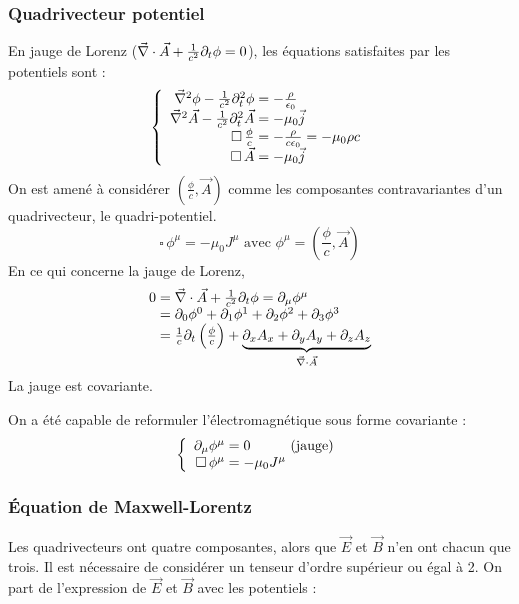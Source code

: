 \subsubsection{Quadrivecteur potentiel}
En jauge de Lorenz ($\vec{\nabla}\cdot\vec{A}+\frac{1}{c^2}\partial_t\phi=0$), les équations satisfaites par les potentiels sont :
$$
	\left\{ \begin{array}{r@{\;}l}
		\nab^2\phi - \frac{1}{c^2}\partial_t^2\phi&=-\frac{\rho}{\epsilon_0}\\
		\nab^2\vec{A}-\frac{1}{c^2}\partial_t^2\vec{A}&=-\mu_0\vec{j}\\
		\square\,\frac{\phi}{c}&=-\frac{\rho}{c\epsilon_0}=-\mu_0\rho c\\
		\square\,\vec{A}&=-\mu_0\vec{j}
	\end{array} \right.
$$
{\txt On est amené à considérer $(\frac{\phi}{c},\vec{A})$ comme les composantes contravariantes d'un quadrivecteur, le quadri-potentiel.}
$$
	\square\,\phi^\mu=-\mu_0J^\mu
	\text{ avec } \phi^\mu=(\frac{\phi}{c},\vec{A})
$$
En ce qui concerne la jauge de Lorenz,
$$
	\begin{array}{r@{\;}l}
		0&=\nab\cdot\vec{A}+\frac{1}{c^2}\partial_t\phi=\partial_\mu\phi^\mu\\
		&=\partial_0\phi^0+\partial_1\phi^1+\partial_2\phi^2+\partial_3\phi^3\\
		&=\frac{1}{c}\partial_t\left(\frac{\phi}{c}\right)+\underbrace{\partial_xA_x+\partial_yA_y+\partial_zA_z}_{\nab\cdot\vec{A}}
	\end{array}
$$
La jauge est covariante.

\begin{conc}
	On a été capable de reformuler l'électromagnétique sous forme covariante :
	$$
		\left\{ \begin{array}{r@{\;}l}
			\partial_\mu\phi^\mu&=0\text{\hspace{1cm}(jauge)}\\
			\square\,\phi^\mu&=-\mu_0J^\mu
		\end{array} \right.
	$$
\end{conc}

\subsubsection{Équation de Maxwell-Lorentz}
	Les quadrivecteurs ont quatre composantes, alors que $\vec{E}$ et $\vec{B}$ n'en ont chacun que trois. Il est nécessaire de considérer un tenseur d'ordre supérieur ou égal à 2. On part de l'expression de $\vec{E}$ et $\vec{B}$ avec les potentiels :

